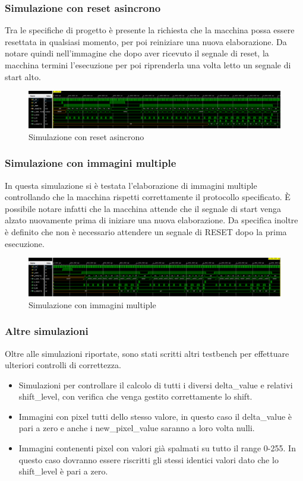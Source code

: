 \documentclass{article}
\begin{document}
\subsubsection{Simulazione con reset asincrono}
Tra le specifiche di progetto è presente la richiesta che la macchina possa essere resettata in qualsiasi momento, per poi reiniziare una nuova elaborazione. Da notare quindi nell'immagine che dopo aver ricevuto il segnale di reset, la macchina termini l'esecuzione per poi riprenderla una volta letto un segnale di start alto.
\begin{figure}[h]
    \includegraphics[width=\textwidth]{test-async-reset.png}
    \centering
    \caption{Simulazione con reset asincrono}
\end{figure}

\subsubsection{Simulazione con immagini multiple}
In questa simulazione si è testata l'elaborazione di immagini multiple controllando che la macchina rispetti correttamente il protocollo specificato. È possibile notare infatti che la macchina attende che il segnale di start venga alzato nuovamente prima di iniziare una nuova elaborazione. Da specifica inoltre è definito che non è necessario attendere un segnale di RESET dopo la prima esecuzione.
\begin{figure}[h]
    \includegraphics[width=\textwidth]{test-multiple-images.png}
    \centering
    \caption{Simulazione con immagini multiple}
\end{figure}

\subsubsection{Altre simulazioni}
Oltre alle simulazioni riportate, sono stati scritti altri testbench per effettuare ulteriori controlli di correttezza.
\begin{itemize}
    \item Simulazioni per controllare il calcolo di tutti i diversi delta\_value e relativi shift\_level, con verifica che venga gestito correttamente lo shift.
    \item Immagini con pixel tutti dello stesso valore, in questo caso il delta\_value è pari a zero e anche i new\_pixel\_value saranno a loro volta nulli.
    \item Immagini contenenti pixel con valori già spalmati su tutto il range 0-255. In questo caso dovranno essere riscritti gli stessi identici valori dato che lo shift\_level è pari a zero.
\end{itemize}
\end{document}
